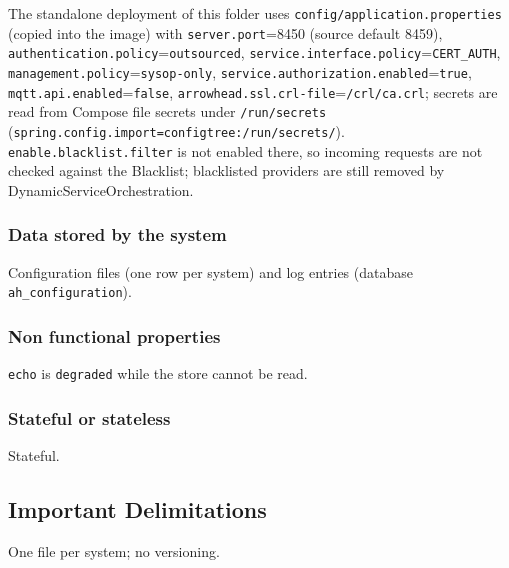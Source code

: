 \documentclass[a4paper]{arrowhead}
\begin{document}
The standalone deployment of this folder uses \texttt{config/\allowbreak{}application.\allowbreak{}properties} (copied into the image) with \texttt{server.\allowbreak{}port}=8450 (source default 8459), \texttt{authentication.\allowbreak{}policy}=\texttt{outsourced}, \texttt{service.\allowbreak{}interface.\allowbreak{}policy}=\texttt{CERT\_AUTH}, \texttt{management.\allowbreak{}policy}=\texttt{sysop-\allowbreak{}only}, \texttt{service.\allowbreak{}authorization.\allowbreak{}enabled}=\texttt{true}, \texttt{mqtt.\allowbreak{}api.\allowbreak{}enabled}=\texttt{false}, \texttt{arrowhead.\allowbreak{}ssl.\allowbreak{}crl-\allowbreak{}file}=\texttt{/\allowbreak{}crl/\allowbreak{}ca.\allowbreak{}crl}; secrets are read from Compose file secrets under \texttt{/\allowbreak{}run/\allowbreak{}secrets} (\texttt{spring.\allowbreak{}config.\allowbreak{}import=\allowbreak{}configtree:\allowbreak{}/\allowbreak{}run/\allowbreak{}secrets/}). \texttt{enable.\allowbreak{}blacklist.\allowbreak{}filter} is not enabled there, so incoming requests are not checked against the Blacklist; blacklisted providers are still removed by Dynamic\allowbreak{}Service\allowbreak{}Orchestration.

\subsubsection{Data stored by the system}

Configuration files (one row per system) and log entries (database \texttt{ah\_\allowbreak{}configuration}).

\subsubsection{Non functional properties}

\texttt{echo} is \texttt{degraded} while the store cannot be read.

\subsubsection{Stateful or stateless}

Stateful.

\subsection{Important Delimitations}
\label{sec:delimitations}

One file per system; no versioning.

\newpage
\end{document}
